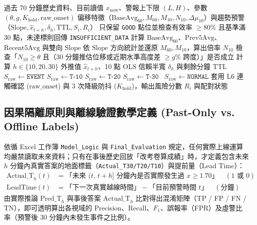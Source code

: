 \documentclass[fontset=none, a4paper, 12pt]{ctexart}
\begin{document}
\begin{doublespace}
\begin{algorithm}[H]
\caption{統一偏移偵測與趨勢預測七層工業硬化演算法 (Unified V1)}
\label{alg:unified_v1}
\begin{algorithmic}[1]
\Require 過去 70 分鐘歷史資料、目前讀值 $x_{\mathrm{now}}$、警報上下限 $(L, H)$、參數 $(\theta, g, K_{\mathrm{hold}}, \text{raw\_onset})$
\Ensure 偏移特徵（$\mathrm{BaseAvg}_{60}, M_{60}, M_{10}, N_{10}, \Delta\mu_{10}$）與趨勢預警（$\mathrm{Slope}, \hat{x}_{t+h}, \delta_h, \mathrm{TTL}, S_i, R_i$）
\State 只保留 \texttt{GOOD} 點位並檢查有效率 $\ge 80\%$ 且基準滿 30 點，未達標則回傳 \texttt{INSUFFICIENT\_DATA} 
\State 計算 $\mathrm{BaseAvg}_{60}$、$\mathrm{Prev5Avg}$、$\mathrm{Recent5Avg}$ 與雙向 $\mathrm{Slope}$ 
\State 依 $\mathrm{Slope}$ 方向統計並還原 $M_{60}, M_{10}$，算出倍率 $N_{10}$ 
\State 檢查「$N_{10}\ge\theta$ 且（30 分鐘推估位移或近期水準高度差 $\ge g\%$ 跨度）」是否成立 
\State 計算 $h\in\{10,20,30\}$ 外推值 $\hat{x}_{t+h}$、10 點 OLS 信賴半寬 $\delta_h$ 與剩餘分鐘 $\mathrm{TTL}$ 
 $S_{\mathrm{raw}} \leftarrow \texttt{EVENT}$ 
 $S_{\mathrm{raw}} \leftarrow \texttt{T-10}$
 $S_{\mathrm{raw}} \leftarrow \texttt{T-20}$
 $S_{\mathrm{raw}} \leftarrow \texttt{T-30}$
\Else\ $S_{\mathrm{raw}} \leftarrow \texttt{NORMAL}$
\EndIf
\State 套用 L6 連觸確認 ($\text{raw\_onset}$) 與 3 次降級防抖 ($K_{\mathrm{hold}}$)，輸出風險分數 $R_i$ 與配對狀態
\end{algorithmic}
\end{algorithm}

\subsection{因果隔離原則與離線驗證數學定義 (Past-Only vs. Offline Labels)}
依循 Excel 工作簿 \texttt{Model\_Logic} 與 \texttt{Final\_Evaluation} 規定，任何實際上線運算均嚴禁讀取未來資料；只有在事後歷史回放「改考卷算成績」時，才定義包含未來 $h$ 分鐘內真實答案的地面標籤（\texttt{Actual\_T30/T20/T10}）與提前量（Lead Time）：
\begin{align}
\mathrm{Actual\_T}_h(t) &= \text{「未來 } (t,\, t+h] \text{ 分鐘內是否實際發生過 } x \ge 1.70\text{」} \quad (1 \text{ 或 } 0) \nonumber \\
\mathrm{LeadTime}(t) &= \text{「下一次真實越線時間」} - \text{「目前預警時間 } t\text{」} \quad (\text{分鐘})
\label{eq:offline_eval}
\end{align}
由實際推論 $\mathrm{Pred\_T}_h$ 與事後答案 $\mathrm{Actual\_T}_h$ 比對得出混淆矩陣（TP / FP / FN / TN），即可透明算出各視域的 Precision、Recall、$F_1$、誤報率（FPR）及虛警比率（預警後 30 分鐘內未發生事件之比例）。


\end{doublespace}
\end{document}
